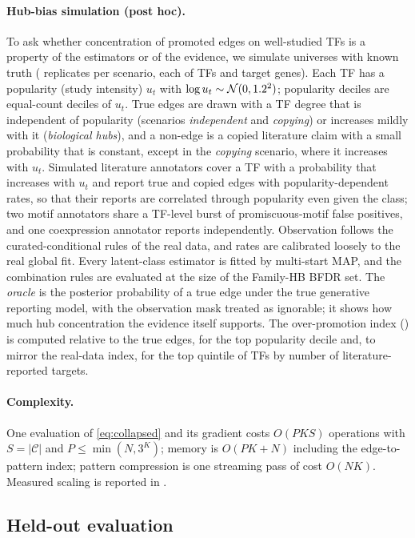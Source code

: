 \paragraph{Hub-bias simulation (post hoc).} To ask whether concentration of promoted edges on well-studied TFs is a property of the estimators or of the evidence, we simulate universes with known truth (\nSimHubNrep{} replicates per scenario, each of \nSimHubTfs{} TFs and \nSimHubGenes{} target genes).
Each TF has a popularity (study intensity) $u_t$ with $\log u_t\sim\mathcal{N}(0,1.2{}^2)$; popularity deciles are equal-count deciles of $u_t$.
True edges are drawn with a TF degree that is independent of popularity (scenarios \emph{independent} and \emph{copying}) or increases mildly with it (\emph{biological hubs}), and a non-edge is a copied literature claim with a small probability that is constant, except in the \emph{copying} scenario, where it increases with $u_t$.
Simulated literature annotators cover a TF with a probability that increases with $u_t$ and report true and copied edges with popularity-dependent rates, so that their reports are correlated through popularity even given the class; two motif annotators share a TF-level burst of promiscuous-motif false positives, and one coexpression annotator reports independently.
Observation follows the curated-conditional rules of the real data, and rates are calibrated loosely to the real global fit.
Every latent-class estimator is fitted by multi-start MAP, and the combination rules are evaluated at the size of the Family-HB BFDR set.
The \emph{oracle} is the posterior probability of a true edge under the true generative reporting model, with the observation mask treated as ignorable; it shows how much hub concentration the evidence itself supports.
The over-promotion index () is computed relative to the true edges, for the top popularity decile and, to mirror the real-data index, for the top quintile of TFs by number of literature-reported targets.

\paragraph{Complexity.} One evaluation of \eqref{eq:collapsed} and its gradient costs $O(PKS)$ operations with $S=|\mathcal{C}|$ and $P\le\min(N,3^K)$; memory is $O(PK+N)$ including the edge-to-pattern index; pattern compression is one streaming pass of cost $O(NK)$. Measured scaling is reported in .

\subsection{Held-out evaluation}\label{sec:eval}
